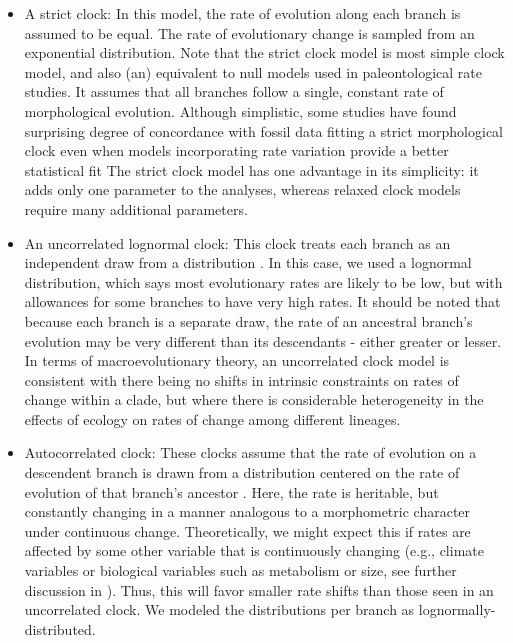 \documentclass{article}
\begin{document}
\begin{itemize}
    \item A strict clock: In this model, the rate of evolution along each branch is assumed to be equal. The rate of evolutionary change is sampled from an exponential distribution. 
    Note that the strict clock model is most simple clock model, and also (an) equivalent to null models used in paleontological rate studies. 
    It assumes that all branches follow a single, constant rate of morphological evolution. 
    Although simplistic, some studies have found surprising degree of concordance with fossil data fitting a strict morphological clock even when models incorporating rate variation provide a better statistical fit \citep{Drummond2016, Wright2017jp}
    The strict clock model has one advantage in its simplicity: it adds only one parameter to the analyses, whereas relaxed clock models require many additional parameters.
    \item An uncorrelated lognormal clock: This clock treats each branch as an independent draw from a distribution \citep{Drummond2006, Drummond2007}.  
    In this case, we used a lognormal distribution, which says most evolutionary rates are likely to be low, but with allowances for some branches to have very high rates. 
    It should be noted that because each branch is a separate draw, the rate of an ancestral branch's evolution may be very different than its descendants - either greater or lesser.  In terms of macroevolutionary theory, an uncorrelated clock model is consistent with there being no shifts in intrinsic constraints on rates of change within a clade, but where there is considerable heterogeneity in the effects of ecology on rates of change among different lineages.  
    \item Autocorrelated clock: These clocks assume that the rate of evolution on a descendent branch is drawn from a distribution centered on the rate of evolution of that branch's ancestor \citep{Aris-Brosou2002}.  Here, the rate is heritable, but constantly changing in a manner analogous to a morphometric character under continuous change.  Theoretically, we might expect this if rates are affected by some other variable that is continuously changing (e.g., climate variables or biological variables such as metabolism or size, see further discussion in \cite{bromham1996, gaut1992,thomas2006,bromham2015}).  %
    Thus, this will favor smaller rate shifts than those seen in an uncorrelated clock. 
    We modeled the distributions per branch as lognormally-distributed.

\end{itemize}
\end{document}
